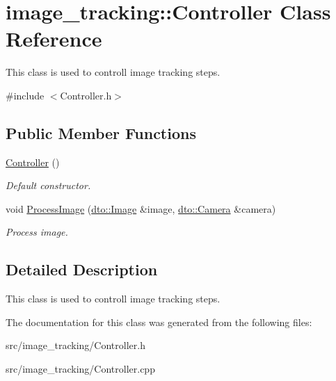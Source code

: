 \hypertarget{classimage__tracking_1_1_controller}{}\section{image\+\_\+tracking\+:\+:Controller Class Reference}
\label{classimage__tracking_1_1_controller}


This class is used to controll image tracking steps.  




{\ttfamily \#include $<$Controller.\+h$>$}

\subsection*{Public Member Functions}
\begin{DoxyCompactItemize}
\item 
\mbox{\label{classimage__tracking_1_1_controller_af6698984eedf909c83458e5fea19b65a}} 
\mbox{\hyperlink{classimage__tracking_1_1_controller_af6698984eedf909c83458e5fea19b65a}{Controller}} ()
\begin{DoxyCompactList}\small\item\em Default constructor. \end{DoxyCompactList}\item 
\mbox{\label{classimage__tracking_1_1_controller_aeb8f993059c85f4da15e011ad4da0d39}} 
void \mbox{\hyperlink{classimage__tracking_1_1_controller_aeb8f993059c85f4da15e011ad4da0d39}{Process\+Image}} (\mbox{\hyperlink{structdto_1_1_image}{dto\+::\+Image}} \&image, \mbox{\hyperlink{structdto_1_1_camera}{dto\+::\+Camera}} \&camera)
\begin{DoxyCompactList}\small\item\em Process image. \end{DoxyCompactList}\end{DoxyCompactItemize}


\subsection{Detailed Description}
This class is used to controll image tracking steps. 

The documentation for this class was generated from the following files\+:\begin{DoxyCompactItemize}
\item 
src/image\+\_\+tracking/Controller.\+h\item 
src/image\+\_\+tracking/Controller.\+cpp\end{DoxyCompactItemize}
